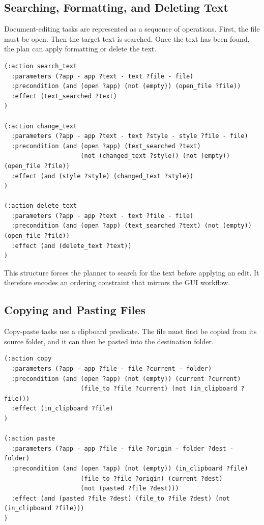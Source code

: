 \subsection{Searching, Formatting, and Deleting Text}

Document-editing tasks are represented as a sequence of operations. First, the file must be open. Then the target text is searched. Once the text has been found, the plan can apply formatting or delete the text.

\begin{lstlisting}
(:action search_text
  :parameters (?app - app ?text - text ?file - file)
  :precondition (and (open ?app) (not (empty)) (open_file ?file))
  :effect (text_searched ?text)
)

(:action change_text
  :parameters (?app - app ?text - text ?style - style ?file - file)
  :precondition (and (open ?app) (text_searched ?text)
                     (not (changed_text ?style)) (not (empty)) (open_file ?file))
  :effect (and (style ?style) (changed_text ?style))
)

(:action delete_text
  :parameters (?app - app ?text - text ?file - file)
  :precondition (and (open ?app) (text_searched ?text) (not (empty)) (open_file ?file))
  :effect (and (delete_text ?text))
)
\end{lstlisting}

This structure forces the planner to search for the text before applying an edit. It therefore encodes an ordering constraint that mirrors the GUI workflow.

\subsection{Copying and Pasting Files}

Copy-paste tasks use a clipboard predicate. The file must first be copied from its source folder, and it can then be pasted into the destination folder.

\begin{lstlisting}
(:action copy
  :parameters (?app - app ?file - file ?current - folder)
  :precondition (and (open ?app) (not (empty)) (current ?current)
                     (file_to ?file ?current) (not (in_clipboard ?file)))
  :effect (in_clipboard ?file)
)

(:action paste
  :parameters (?app - app ?file - file ?origin - folder ?dest - folder)
  :precondition (and (open ?app) (not (empty)) (in_clipboard ?file)
                     (file_to ?file ?origin) (current ?dest)
                     (not (pasted ?file ?dest)))
  :effect (and (pasted ?file ?dest) (file_to ?file ?dest) (not (in_clipboard ?file)))
)
\end{lstlisting}

